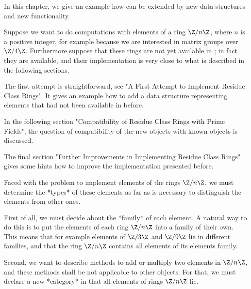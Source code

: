 

In this chapter, we give an example how {\GAP} can be extended
by new data structures and new functionality.

Suppose we want to do computations with elements of a ring $\Z/n\Z$,
where $n$ is a positive integer,
for example because we are interested in matrix groups over $\Z/4\Z$.
Furthermore suppose that these rings are not yet available in {\GAP};
in fact they are available, and their implementation is very close to
what is described in the following sections.

The first attempt is straightforward,
see "A First Attempt to Implement Residue Class Rings".
It gives an example how to add a data structure representing elements
that had not been available in {\GAP} before.

In the following section
"Compatibility of Residue Class Rings with Prime Fields",
the question of compatibility of the new objects with known objects is
discussed.

The final section
"Further Improvements in Implementing Residue Class Rings"
gives some hints how to improve the implementation presented before.


Faced with the problem to implement elements of the rings $\Z/n\Z$,
we must determine the *types* of these elements as far as is necessary to
distinguish the elements from other ones.

First of all, we must decide about the *family* of each element.
A natural way to do this is to put the elements of each ring $\Z/n\Z$
into a family of their own.
This means that for example elements of $\Z/3\Z$ and $\Z/9\Z$ lie
in different families,
and that the ring $\Z/n\Z$ contains all elements of its elements family.

Second, we want to describe methods to add or multiply two elements in
$\Z/n\Z$,
and these methods shall be not applicable to other {\GAP} objects.
For that, we must declare a new *category* in that all elements of rings
$\Z/n\Z$ lie.

